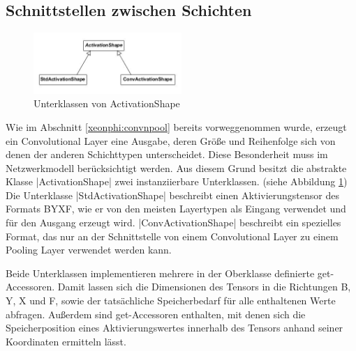 \documentclass[../main.tex]{subfiles}
\begin{document}
\subsection{Schnittstellen zwischen Schichten}
\begin{figure}
	\centering 
	\includegraphics[width=0.5\textwidth]{../images/Schmidt/cd_netdesc_actshapes.jpg} 
	\caption {Unterklassen von ActivationShape}
	\label{pic:cd_Netdesc_actshapes} 
\end{figure} 
Wie im Abschnitt \ref{xeonphi:convnpool} bereits vorweggenommen wurde, erzeugt ein Convolutional Layer eine Ausgabe, deren Größe und Reihenfolge sich von denen der anderen Schichttypen unterscheidet. Diese Besonderheit muss im Netzwerkmodell berücksichtigt werden. Aus diesem Grund besitzt die abstrakte Klasse |ActivationShape| zwei instanziierbare Unterklassen. (siehe Abbildung \ref{pic:cd_Netdesc_actshapes}) Die Unterklasse |StdActivationShape| beschreibt einen Aktivierungstensor des Formats BYXF, wie er von den meisten Layertypen als Eingang verwendet und für den Ausgang erzeugt wird. |ConvActivationShape| beschreibt ein spezielles Format, das nur an der Schnittstelle von einem Convolutional Layer zu einem Pooling Layer verwendet werden kann. 

Beide Unterklassen implementieren mehrere in der Oberklasse definierte get-Accessoren. Damit lassen sich die Dimensionen des Tensors in die Richtungen B, Y, X und F, sowie der tatsächliche Speicherbedarf für alle enthaltenen Werte abfragen. Außerdem sind get-Accessoren enthalten, mit denen sich die Speicherposition eines Aktivierungswertes innerhalb des Tensors anhand seiner Koordinaten ermitteln lässt. 
\end{document}
